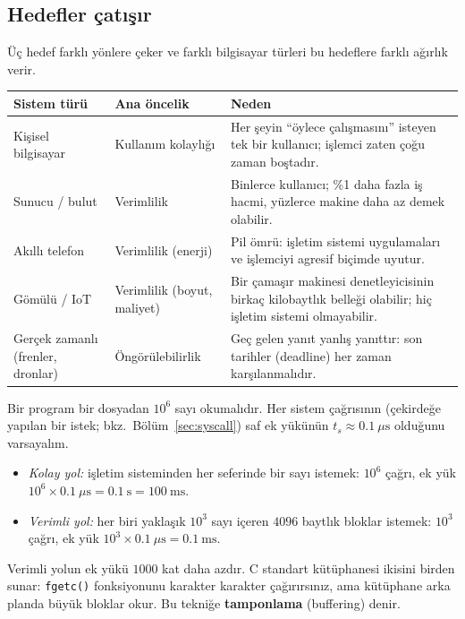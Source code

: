 \documentclass[11pt,a4paper]{article}
\newcommand{\term}[1]{\textbf{\color{mintdeep}#1}}
\newcommand{\cmd}[1]{\texttt{#1}}
\begin{document}
\subsection{Hedefler çatışır}

Üç hedef farklı yönlere çeker ve farklı bilgisayar türleri bu hedeflere farklı ağırlık verir.

\begin{center}
\renewcommand{\arraystretch}{1.3}
\begin{tabularx}{\linewidth}{>{\raggedright\arraybackslash}p{3.3cm} >{\raggedright\arraybackslash}p{3.2cm} >{\raggedright\arraybackslash}X}
\toprule
\textbf{Sistem türü} & \textbf{Ana öncelik} & \textbf{Neden} \\
\midrule
Kişisel bilgisayar & Kullanım kolaylığı & Her şeyin ``öylece çalışmasını'' isteyen tek bir kullanıcı; işlemci zaten çoğu zaman boştadır. \\
Sunucu / bulut & Verimlilik & Binlerce kullanıcı; \%1 daha fazla iş hacmi, yüzlerce makine daha az demek olabilir. \\
Akıllı telefon & Verimlilik (enerji) & Pil ömrü: işletim sistemi uygulamaları ve işlemciyi agresif biçimde uyutur. \\
Gömülü / IoT & Verimlilik (boyut, maliyet) & Bir çamaşır makinesi denetleyicisinin birkaç kilobaytlık belleği olabilir; hiç işletim sistemi olmayabilir. \\
Gerçek zamanlı (frenler, dronlar) & Öngörülebilirlik & Geç gelen yanıt yanlış yanıttır: son tarihler (deadline) her zaman karşılanmalıdır. \\
\bottomrule
\end{tabularx}
\end{center}

\begin{example}
Bir program bir dosyadan $10^{6}$ sayı okumalıdır. Her sistem çağrısının (çekirdeğe yapılan bir istek; bkz.\ Bölüm~\ref{sec:syscall}) saf ek yükünün $t_{s} \approx 0.1\ \mu\text{s}$ olduğunu varsayalım.
\begin{itemize}
  \item \emph{Kolay yol:} işletim sisteminden her seferinde bir sayı istemek: $10^{6}$ çağrı, ek yük $10^{6} \times 0.1\ \mu\text{s} = 0.1\ \text{s} = 100\ \text{ms}$.
  \item \emph{Verimli yol:} her biri yaklaşık $10^{3}$ sayı içeren $4096$ baytlık bloklar istemek: $10^{3}$ çağrı, ek yük $10^{3} \times 0.1\ \mu\text{s} = 0.1\ \text{ms}$.
\end{itemize}
Verimli yolun ek yükü $1000$ kat daha azdır. C standart kütüphanesi ikisini birden sunar: \cmd{fgetc()} fonksiyonunu karakter karakter çağırırsınız, ama kütüphane arka planda büyük bloklar okur. Bu tekniğe \term{tamponlama} (buffering) denir.
\end{example}
\end{document}

